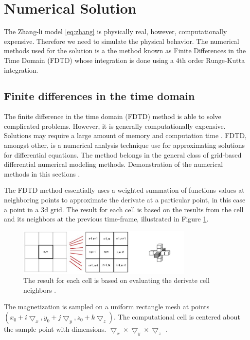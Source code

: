 \section{Numerical Solution}

The Zhang-li model \ref{eq:zhang} is physically real, however, computationally expensive. Therefore we need to simulate the physical behavior. The numerical methods used for the solution is a the method known as Finite Differences in the Time Domain (FDTD) whose integration is done using a 4th order Runge-Kutta integration.

\subsection{Finite differences in the time domain}

The finite difference in the time domain (FDTD) method  is able to solve complicated problems. However, it is generally computationally expensive. Solutions may require a large amount of memory and computation time \cite{ufdtd}. FDTD, amongst other, is a numerical analysis technique use for approximating solutions for differential equations. The method belongs in the general class of grid-based differential numerical modeling methods. Demonstration of the numerical methods in this sections \cite{methods}.

The FDTD method essentially uses a weighted summation of functions values at neighboring points to approximate the derivate at a particular point, in this case a point in a 3d grid. The result for each cell is based on the results from the cell and its neighbors at the previous time-frame, illustrated in Figure \ref{fig:fdtd}.  

\begin{figure}[htbp]
	\centering
		\includegraphics[width=0.78\textwidth]{Figures/fdtd.png}
		\smallskip
	\caption[FDTD grid]{The result for each cell is based on evaluating the derivate cell neighbors \cite{methods}.}
	\label{fig:fdtd}
\end{figure}

The magnetization is sampled on a uniform rectangle mesh at points $(x_0 + i\bigtriangledown_x, y_0 + j\bigtriangledown_y, z_0 + k\bigtriangledown_z)$. The computational cell is centered about the sample point with dimensions. $\bigtriangledown_x \times \bigtriangledown_y \times \bigtriangledown_z$ \cite{methods}.

